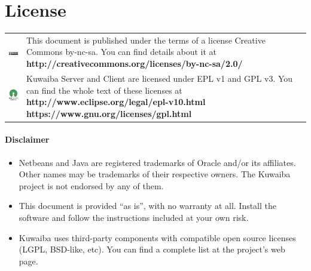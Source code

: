 \documentclass[a4paper]{article}
\begin{document}
	\section{License}
		\begin{table}[ht]
			\centering
			\begin{tabular}{cp{10cm}}
				
				\includegraphics[]{img/cc_license_logo.jpg} & This document is published under the terms of a license Creative Commons by-nc-sa. You can find details about it at\linebreak
				\textbf{http://creativecommons.org/licenses/by-nc-sa/2.0/ } \\

				\includegraphics[width=2cm]{img/osi_logo.jpg} & Kuwaiba Server and Client are licensed under EPL v1 and GPL v3. You can find the whole text of these licenses at \linebreak
				\textbf{http://www.eclipse.org/legal/epl-v10.html} \linebreak
				\textbf{https://www.gnu.org/licenses/gpl.html} \\
			\end{tabular}
		\end{table}
		\paragraph{Disclaimer} \hspace{0pt}
		\begin{itemize}
			\item Netbeans and Java are registered trademarks of Oracle and/or its affiliates. Other names may be trademarks of their respective owners. The Kuwaiba project is not endorsed by any of them.
			
			\item This document is provided “as is”, with no warranty at all. Install the software and follow the instructions included at your own risk.
			
			\item Kuwaiba uses third-party components with compatible open source licenses (LGPL, BSD-like, etc). You can find a complete list at the project's web page.
		\end{itemize}
	
\end{document}
